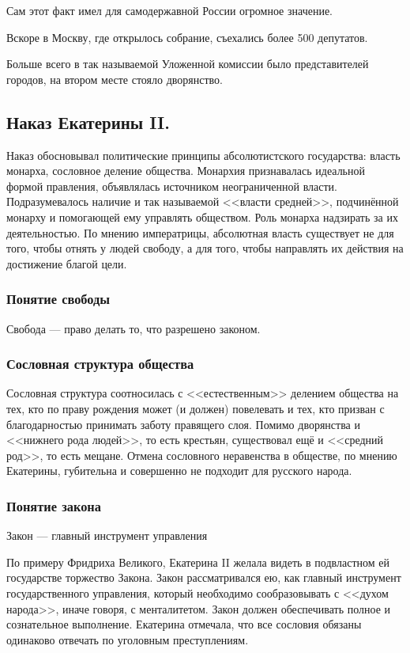 Сам этот факт имел для самодержавной России огромное значение.

Вскоре в Москву, где открылось собрание, съехались более 500 депутатов. 

Больше всего в так называемой Уложенной комиссии было представителей городов, на втором месте стояло дворянство.

\subsection{Наказ Екатерины II.}

Наказ обосновывал политические принципы абсолютистского государства: власть монарха, сословное деление общества. Монархия признавалась идеальной формой правления, объявлялась источником неограниченной власти. Подразумевалось наличие и так называемой <<власти средней>>, подчинённой монарху и помогающей ему управлять обществом. Роль монарха надзирать за их деятельностью. По мнению императрицы, абсолютная власть существует не для того, чтобы отнять у людей свободу, а для того, чтобы направлять их действия на достижение благой цели.

\subsubsection{Понятие свободы}

Свобода — право делать то, что разрешено законом.

\subsubsection{Сословная структура общества}

Сословная структура соотносилась с <<естественным>> делением общества на тех, кто по праву рождения может (и должен) повелевать и тех, кто призван с благодарностью принимать заботу правящего слоя. Помимо дворянства и <<нижнего рода людей>>, то есть крестьян, существовал ещё и <<средний род>>, то есть мещане. Отмена сословного неравенства в обществе, по мнению Екатерины, губительна и совершенно не подходит для русского народа.

\subsubsection{Понятие закона}
Закон — главный инструмент управления

По примеру Фридриха Великого, Екатерина II желала видеть в подвластном ей государстве торжество Закона. Закон рассматривался ею, как главный инструмент государственного управления, который необходимо сообразовывать с <<духом народа>>, иначе говоря, с менталитетом. Закон должен обеспечивать полное и сознательное выполнение. Екатерина отмечала, что все сословия обязаны одинаково отвечать по уголовным преступлениям.

